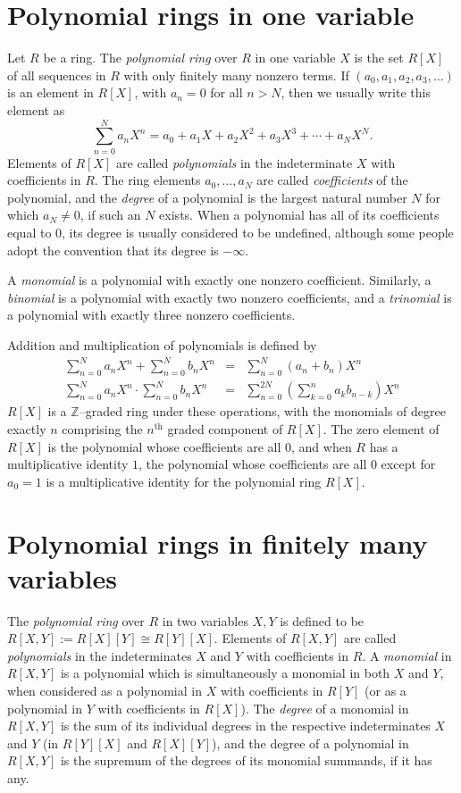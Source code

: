 \documentclass[12pt]{article}
\begin{document}
\section{Polynomial rings in one variable}
Let $R$ be a ring. The \emph{polynomial ring} over $R$ in one variable $X$ is the set $R[X]$ of all sequences in $R$ with only finitely many nonzero terms. If $(a_0, a_1, a_2, a_3, \dots)$ is an element in $R[X]$, with $a_n = 0$ for all $n > N$, then we usually write this element as
$$
\sum_{n=0}^N a_n X^n = a_0 + a_1 X + a_2 X^2 + a_3 X^3 + \cdots + a_N X^N.
$$
Elements of $R[X]$ are called \emph{polynomials} in the indeterminate $X$ with coefficients in $R$. The ring elements $a_0, \ldots, a_N$ are called \emph{coefficients} of the polynomial, and the \emph{degree} of a polynomial is the largest natural number $N$ for which $a_N \neq 0$, if such an $N$ exists. When a polynomial has all of its coefficients equal to $0$, its degree is usually considered to be undefined, although some people adopt the convention that its degree is $-\infty$.

A \emph{monomial} is a polynomial with exactly one nonzero coefficient. Similarly, a \emph{binomial} is a polynomial with exactly two nonzero coefficients, and a \emph{trinomial} is a polynomial with exactly three nonzero coefficients.

Addition and multiplication of polynomials is defined by
\begin{eqnarray}
\sum_{n=0}^N a_n X^n + \sum_{n=0}^N b_n X^n & = & \sum_{n=0}^N (a_n+b_n) X^n \\
\sum_{n=0}^N a_n X^n \cdot \sum_{n=0}^N b_n X^n & = & \sum_{n=0}^{2N} \left(\sum_{k=0}^n a_k b_{n-k}\right) X^n
\end{eqnarray}
$R[X]$ is a $\mathbb{Z}$--graded ring under these operations, with the monomials of degree exactly $n$ comprising the $n^\mathrm{th}$ graded component of $R[X]$. The zero element of $R[X]$ is the polynomial whose coefficients are all $0$, and when $R$ has a multiplicative identity $1$, the polynomial whose coefficients are all $0$ except for $a_0 = 1$ is a multiplicative identity for the polynomial ring $R[X]$.

\section{Polynomial rings in finitely many variables}

The \emph{polynomial ring} over $R$ in two variables $X,Y$ is defined to be $R[X,Y] := R[X][Y] \cong R[Y][X]$. Elements of $R[X,Y]$ are called \emph{polynomials} in the indeterminates $X$ and $Y$ with coefficients in $R$. A \emph{monomial} in $R[X,Y]$ is a polynomial which is simultaneously a monomial in both $X$ and $Y$, when considered as a polynomial in $X$ with coefficients in $R[Y]$ (or as a polynomial in $Y$ with coefficients in $R[X]$). The \emph{degree} of a monomial in $R[X,Y]$ is the sum of its individual degrees in the respective indeterminates $X$ and $Y$ (in $R[Y][X]$ and $R[X][Y]$), and the degree of a polynomial in $R[X,Y]$ is the supremum of the degrees of its monomial summands, if it has any.
\end{document}
